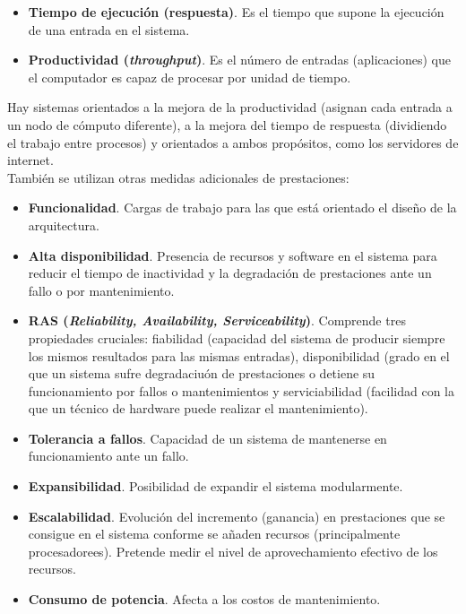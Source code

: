 \documentclass[12pt,spanish]{article}
\begin{document}
\begin{itemize}
	\item \textbf{Tiempo de ejecución (respuesta)}. Es el tiempo que supone la ejecución de una entrada en el sistema.
	\item \textbf{Productividad (\textit{throughput})}. Es el número de entradas (aplicaciones) que el computador es capaz de procesar por unidad de tiempo.
\end{itemize}

Hay sistemas orientados a la mejora de la productividad (asignan cada entrada a un nodo de cómputo diferente), a la mejora del tiempo de respuesta (dividiendo el trabajo entre procesos) y orientados a ambos propósitos, como los servidores de internet.\\

También se utilizan otras medidas adicionales de prestaciones:

\begin{itemize}
	\item\textbf{Funcionalidad}. Cargas de trabajo para las que está orientado el diseño de la arquitectura.
	\item \textbf{Alta disponibilidad}. Presencia de recursos y software en el sistema para reducir el tiempo de inactividad y la degradación de prestaciones ante un fallo o por mantenimiento.
	\item \textbf{RAS (\textit{Reliability, Availability, Serviceability})}. Comprende tres propiedades cruciales: fiabilidad (capacidad del sistema de producir siempre los mismos resultados para las mismas entradas), disponibilidad (grado en el que un sistema sufre degradaciuón de prestaciones o detiene su funcionamiento por fallos o mantenimientos y serviciabilidad (facilidad con la que un técnico de hardware puede realizar el mantenimiento).
	\item \textbf{Tolerancia a fallos}. Capacidad de un sistema de mantenerse en funcionamiento ante un fallo.
	\item \textbf{Expansibilidad}. Posibilidad de expandir el sistema modularmente.
	\item \textbf{Escalabilidad}. Evolución del incremento (ganancia) en prestaciones que se consigue en el sistema conforme se añaden recursos (principalmente procesadorees). Pretende medir el nivel de aprovechamiento efectivo de los recursos.
	\item \textbf{Consumo de potencia}. Afecta a los costos de mantenimiento.
\end{itemize}
\end{document}
